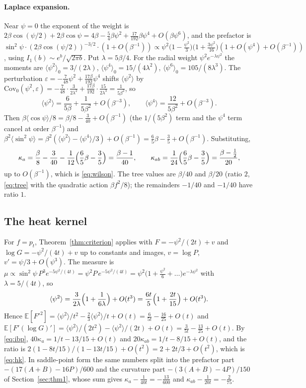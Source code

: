 \documentclass[11pt,a4paper]{article}
\theoremstyle{definition}
\theoremstyle{remark}
\newcommand{\E}{\mathbb{E}}
\begin{document}
\paragraph{Laplace expansion.}
Near $\psi=0$ the exponent of the weight is $2\beta\cos(\psi/2)+2\beta\cos\psi=4\beta-\tfrac54\beta\psi^2+\tfrac{17}{192}\beta\psi^4+O(\beta\psi^6)$, and the prefactor is $\sin^2\psi\cdot(2\beta\cos(\psi/2))^{-3/2}\cdot(1+O(\beta^{-1}))\propto\psi^2\bigl(1-\tfrac{\psi^2}3\bigr)\bigl(1+\tfrac{3\psi^2}{16}\bigr)(1+O(\psi^4)+O(\beta^{-1}))$, using $I_1(b)\sim e^b/\sqrt{2\pi b}$.
Put $\lambda=5\beta/4$.
For the radial weight $\psi^2e^{-\lambda\psi^2}$ the moments are $\langle\psi^2\rangle_0=3/(2\lambda)$, $\langle\psi^4\rangle_0=15/(4\lambda^2)$, $\langle\psi^6\rangle_0=105/(8\lambda^3)$.
The perturbation $\varepsilon=-\tfrac7{48}\psi^2+\tfrac{17\beta}{192}\psi^4$ shifts $\langle\psi^2\rangle$ by $\mathrm{Cov}_0(\psi^2,\varepsilon)=-\tfrac7{48}\cdot\tfrac3{2\lambda^2}+\tfrac{17\beta}{192}\cdot\tfrac{15}{2\lambda^3}=\tfrac{1}{5\beta^2}$, so
\[
\langle\psi^2\rangle=\frac6{5\beta}+\frac1{5\beta^2}+O(\beta^{-3}),\qquad \langle\psi^4\rangle=\frac{12}{5\beta^2}+O(\beta^{-3}).
\]
Then $\beta\langle\cos\psi\rangle/8=\beta/8-\tfrac3{40}+O(\beta^{-1})$ (the $1/(5\beta^2)$ term and the $\psi^4$ term cancel at order $\beta^{-1}$) and $\beta^2\langle\sin^2\psi\rangle=\beta^2(\langle\psi^2\rangle-\langle\psi^4\rangle/3)+O(\beta^{-1})=\tfrac65\beta-\tfrac35+O(\beta^{-1})$.
Substituting,
\[
\kappa_a=\frac\beta8-\frac3{40}-\frac1{12}\Bigl(\frac65\beta-\frac35\Bigr)=\frac{\beta-1}{40},\qquad \kappa_{ab}=\frac1{24}\Bigl(\frac65\beta-\frac35\Bigr)=\frac{\beta-\frac12}{20},
\]
up to $O(\beta^{-1})$, which is \eqref{eq:wilson}.
The tree values are $\beta/40$ and $\beta/20$ (ratio $2$, \eqref{eq:tree} with the quadratic action $\beta f^2/8$); the remainders $-1/40$ and $-1/40$ have ratio $1$.

\subsection{The heat kernel}\label{app:hk}
For $f=p_t$, Theorem~\ref{thm:criterion} applies with $F=-\psi^2/(2t)+v$ and $\log G=-\psi^2/(4t)+v$ up to constants and images, $v=\log P$, $v'=\psi/3+O(\psi^3)$.
The measure is $\mu\propto\sin^2\psi\,P^3e^{-5\psi^2/(4t)}=\psi^2P\,e^{-5\psi^2/(4t)}=\psi^2\bigl(1+\tfrac{\psi^2}6+\dots\bigr)e^{-\lambda\psi^2}$ with $\lambda=5/(4t)$, so
\[
\langle\psi^2\rangle=\frac3{2\lambda}\Bigl(1+\frac1{6\lambda}\Bigr)+O(t^3)=\frac{6t}5\Bigl(1+\frac{2t}{15}\Bigr)+O(t^3).
\]
Hence $\E[F'^2]=\langle\psi^2\rangle/t^2-\tfrac23\langle\psi^2\rangle/t+O(t)=\tfrac6{5t}-\tfrac{16}{25}+O(t)$ and $\E[F'(\log G)']=\langle\psi^2\rangle/(2t^2)-\langle\psi^2\rangle/(2t)+O(t)=\tfrac3{5t}-\tfrac{13}{25}+O(t)$.
By \eqref{eq:ibp}, $40\kappa_a=1/t-13/15+O(t)$ and $20\kappa_{ab}=1/t-8/15+O(t)$, and the ratio is $2(1-8t/15)/(1-13t/15)+O(t^2)=2+2t/3+O(t^2)$, which is \eqref{eq:hk}.
In saddle-point form the same numbers split into the prefactor part $-(17(A+B)-16P)/600$ and the curvature part $-(3(A+B)-4P)/150$ of Section~\ref{sec:thm1}, whose sum gives $\kappa_a-\tfrac1{40t}=-\tfrac{13}{600}$ and $\kappa_{ab}-\tfrac1{20t}=-\tfrac2{75}$.
\end{document}
